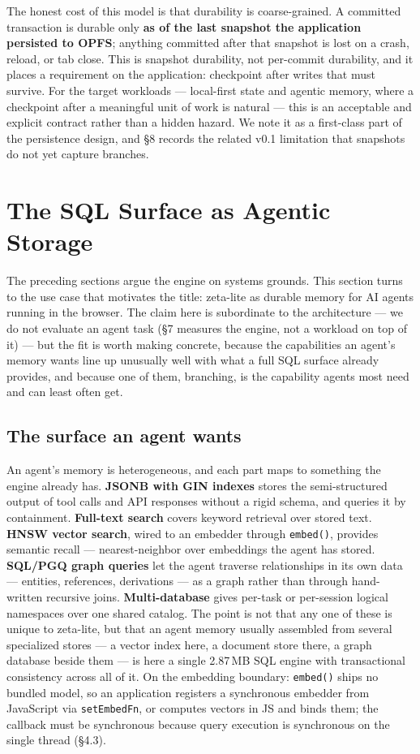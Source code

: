 \documentclass[11pt]{article}
\begin{document}
The honest cost of this model is that durability is coarse-grained. A committed
transaction is durable only \textbf{as of the last snapshot the application
persisted to OPFS}; anything committed after that snapshot is lost on a crash,
reload, or tab close. This is snapshot durability, not per-commit durability, and it
places a requirement on the application: checkpoint after writes that must survive.
For the target workloads --- local-first state and agentic memory, where a
checkpoint after a meaningful unit of work is natural --- this is an acceptable and
explicit contract rather than a hidden hazard. We note it as a first-class part of
the persistence design, and \S8 records the related v0.1 limitation that snapshots
do not yet capture branches.

\section{The SQL Surface as Agentic Storage}

The preceding sections argue the engine on systems grounds. This section turns to
the use case that motivates the title: zeta-lite as durable memory for AI agents
running in the browser. The claim here is subordinate to the architecture --- we do
not evaluate an agent task (\S7 measures the engine, not a workload on top of it)
--- but the fit is worth making concrete, because the capabilities an agent's memory
wants line up unusually well with what a full SQL surface already provides, and
because one of them, branching, is the capability agents most need and can least
often get.

\subsection{The surface an agent wants}

An agent's memory is heterogeneous, and each part maps to something the engine
already has. \textbf{JSONB with GIN indexes} stores the semi-structured output of
tool calls and API responses without a rigid schema, and queries it by containment.
\textbf{Full-text search} covers keyword retrieval over stored text. \textbf{HNSW
vector search}, wired to an embedder through \texttt{embed()}, provides semantic
recall --- nearest-neighbor over embeddings the agent has stored. \textbf{SQL/PGQ
graph queries} let the agent traverse relationships in its own data --- entities,
references, derivations --- as a graph rather than through hand-written recursive
joins. \textbf{Multi-database} gives per-task or per-session logical namespaces over
one shared catalog. The point is not that any one of these is unique to zeta-lite,
but that an agent memory usually assembled from several specialized stores --- a
vector index here, a document store there, a graph database beside them --- is here
a single 2.87\,MB SQL engine with transactional consistency across all of it. On the
embedding boundary: \texttt{embed()} ships no bundled model, so an application
registers a synchronous embedder from JavaScript via \texttt{setEmbedFn}, or
computes vectors in JS and binds them; the callback must be synchronous because
query execution is synchronous on the single thread (\S4.3).
\end{document}
